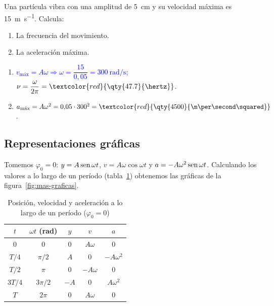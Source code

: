 \begin{exercise}
    Una partícula vibra con una amplitud de \qty{5}{\cm} y su velocidad máxima es \qty{15}{\m\per\second}. Calcula:
    \begin{enumerate}[label=\letraminuscula]
        \item La frecuencia del movimiento.
        \item La aceleración máxima.
    \end{enumerate}
    \begin{solu}
        \begin{enumerate}[label=\letraminuscula]
            \item \textcolor{blue}{\(v_{\text{máx}} = A\omega \Rightarrow \omega = \dfrac{15}{0{,}05} = \qty{300}{\radian\per\second}\);}
            \(\nu = \dfrac{\omega}{2\pi} = \textcolor{red}{\qty{47.7}{\hertz}}\).
            \item \(a_{\text{máx}} = A\omega^2 = 0{,}05\cdot 300^2 = \textcolor{red}{\qty{4500}{\m\per\second\squared}}\).
        \end{enumerate}
    \end{solu}
\end{exercise}

\subsection{Representaciones gráficas}\label{subsec:mas-graficas}

Tomemos \(\varphi_0 = 0\): \(y = A\operatorname{sen}\omega t\), \(v = A\omega\cos\omega t\) y \(a = -A\omega^2\operatorname{sen}\omega t\). Calculando
los valores a lo largo de un período (tabla~\ref{tab:mas-valores}) obtenemos las gráficas de la figura~\ref{fig:mas-graficas}.

\begin{table}[H]
    \centering
    \caption{Posición, velocidad y aceleración a lo largo de un período (\(\varphi_0 = 0\))}
    \vspace{-5pt}
    \begin{tabular}{@{}ccccc@{}}
        \toprule
        \(t\) & \(\omega t\) (\unit{\radian}) & \(y\) & \(v\) & \(a\) \\
        \midrule
        \(0\) & \(0\) & \(0\) & \(A\omega\) & \(0\) \\[3pt]
        \(T/4\) & \(\pi/2\) & \(A\) & \(0\) & \(-A\omega^2\) \\[3pt]
        \(T/2\) & \(\pi\) & \(0\) & \(-A\omega\) & \(0\) \\[3pt]
        \(3T/4\) & \(3\pi/2\) & \(-A\) & \(0\) & \(A\omega^2\) \\[3pt]
        \(T\) & \(2\pi\) & \(0\) & \(A\omega\) & \(0\) \\
        \bottomrule
    \end{tabular}
    \label{tab:mas-valores}
\end{table}

